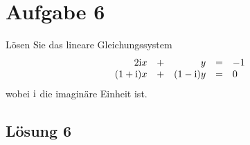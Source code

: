 \documentclass[main.tex]{subfiles}
\begin{document}
\section{Aufgabe 6}
Lösen Sie das lineare Gleichungssystem
$$
    \begin{array}{rcrcl}
        2\mathrm{i}x &+ & y &= & -1 \\
        (1+\mathrm{i})x &+ & (1-\mathrm{i})y &= & 0\\
    \end{array}
$$
wobei $\mathrm{i}$ die imaginäre Einheit ist.

\subsection{Lösung 6}
\end{document}
